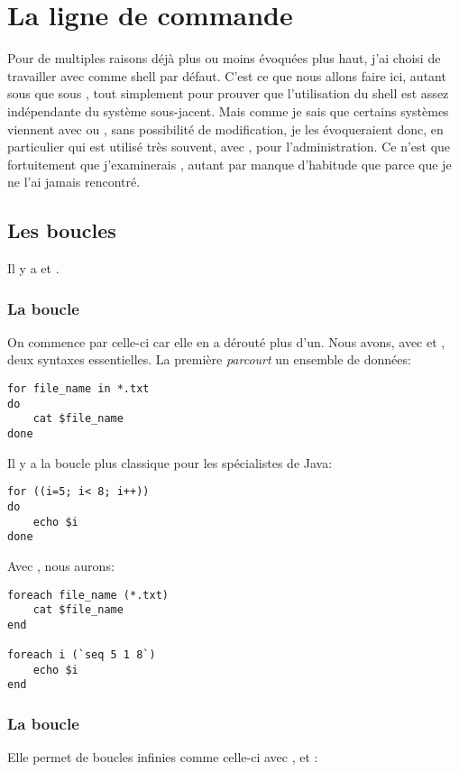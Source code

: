 
\section{La ligne de commande}
Pour de multiples raisons déjà plus ou moins évoquées plus haut, j'ai choisi de travailler avec \zsh{} comme shell par défaut. C'est ce que nous allons faire ici, autant sous \freebsd{} que sous \linux{}, tout simplement pour prouver que l'utilisation du shell est assez indépendante du système sous-jacent. Mais comme je sais que certains systèmes viennent avec \bash{} ou \tcsh{}, sans possibilité de modification, je les évoqueraient donc, en particulier \tcsh{} qui est utilisé très souvent, avec \csh{}, pour l'administration. Ce n'est que fortuitement que j'examinerais \ksh{},  autant par manque d'habitude que parce que je ne l'ai jamais rencontré.

\subsection{Les boucles}
Il y a  et .

\subsubsection{La boucle }
On commence par celle-ci car elle en a dérouté plus d'un. Nous avons, avec \zsh{} et \bash, deux syntaxes essentielles. La première \emph{parcourt} un ensemble de données:

\begin{lstlisting}[caption=une boucle for]
for file_name in *.txt
do
	cat $file_name
done
\end{lstlisting}

Il y a la boucle plus classique pour les spécialistes de Java:

\begin{lstlisting}[caption=une boucle for comme en Java]
for ((i=5; i< 8; i++))
do
	echo $i
done
\end{lstlisting}

Avec \tcsh{}, nous aurons:

\begin{lstlisting}[caption=parcours d'une liste avec tcsh]
foreach file_name (*.txt)
	cat $file_name
end

foreach i (`seq 5 1 8`)
	echo $i
end
\end{lstlisting}


\subsubsection{La boucle }
Elle permet de boucles infinies comme celle-ci avec \zsh{}, \bash{} et \ksh{}:

